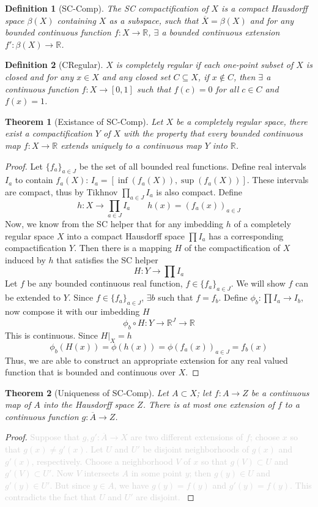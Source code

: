 \documentclass[article,11pt, reqno]{article}
\newtheorem*{theorem}{Theorem}
\newtheorem*{definition}{Definition}
\theoremstyle{remark}
\newcommand{\R}{\mathbb{R}}
\newcommand{\ra}{\rightarrow}
\newcommand{\<}{\langle}
\renewcommand{\>}{\rangle}
\newcommand{\ex}{\exists}
\begin{document}
\begin{definition}[SC-Comp]
    The SC compactification of $X$ is a compact Hausdorff space $\beta(X)$ containing $X$ as a subspace, such that $\overline{X}=\beta(X)$ and for any bounded continuous function $f:X\ra\R$, $\ex$ a bounded continuous extension $f':\beta(X)\ra\R$.
\end{definition}
\begin{definition}[CRegular]
    $X$ is completely regular if each one-point subset of $X$ is closed and for any $x\in X$ and any closed set $C\subseteq X$, if $x\notin C$, then $\ex$ a continuous function $f:X\ra [0,1]$ such that $f(c)=0$ for all $c\in C$ and $f(x)=1$.
\end{definition}
\begin{theorem}[Existance of SC-Comp]
    Let $X$ be a completely regular space, there exist a compactification $Y$ of $X$ with the property that every bounded continuous map $f: X\ra\R$ extends uniquely to a continuous map $Y$ into $\R$.
\end{theorem}
\begin{proof}
    Let $\{f_a\}_{a\in J}$ be the set of all bounded real functions. Define real intervals $I_a$ to contain $f_a(X)$: $I_a=[\inf(f_a(X)),\sup(f_a(X))]$. These intervals are compact, thus by Tikhnov $\prod_{a\in J}I_a$ is also compact. Define 
    $$
        h:X \ra \prod_{a\in J}I_a\qquad h(x)=(f_a(x))_{a\in J}
    $$
    Now, we know from the SC helper that for any imbedding $h$ of a completely regular space $X$ into a compact Hausdorff space $\prod I_a$ has a corresponding compactification $Y$. Then there is a mapping $H$ of the compactification of $X$ induced by $h$ that satisfies the SC helper
    $$
        H: Y\ra \prod I_a
    $$
    Let $f$ be any bounded continuous real function, $f\in\{f_a\}_{a\in J}$. We will show $f$ can be extended to $Y$. Since $f\in\{f_a\}_{a\in J}$, $\ex b$ such that $f=f_b$. Define $\phi_b: \prod I_a\ra I_b$, now compose it with our imbedding $H$
    $$
        \phi_b\circ H: Y\ra \R^J\ra \R
    $$
    This is continuous. Since $H|_X=h$
    $$
        \phi_b(H(x))=\phi(h(x))=\phi(f_a(x))_{a\in J}=f_b(x)
    $$
    Thus, we are able to construct an appropriate extension for any real valued function that is bounded and continuous over $X$.
\end{proof}
\begin{theorem}[Uniqueness of SC-Comp]
    Let $A\subset X$; let $f: A\ra Z$ be a continuous map of $A$ into the Hausdorff space $Z$. There is at most one extension of $f$ to a continuous function $g : \overline{A}\ra Z$.
\end{theorem}
\begin{proof}
\textcolor{lightgray}{
    Suppose that $g, g' : \overline{A}\ra X$ are two different extensions of $f$; choose $x$ so that $g(x)\neq g'(x)$. Let $U$ and $U'$ be disjoint neighborhoods of $g(x)$ and $g'(x)$, respectively. Choose a neighborhood $V$ of $x$ so that $g(V)\subset U$ and $g'(V)\subset U'$. Now $V$ intersects $A$ in some point $y$; then $g(y)\in U$ and $g'(y)\in U'$. But since $y\in A$, we have $g(y)= f(y)$ and $g'(y) = f (y)$. This contradicts the fact that $U$ and $U'$ are disjoint.
    }
\end{proof}
\end{document}
